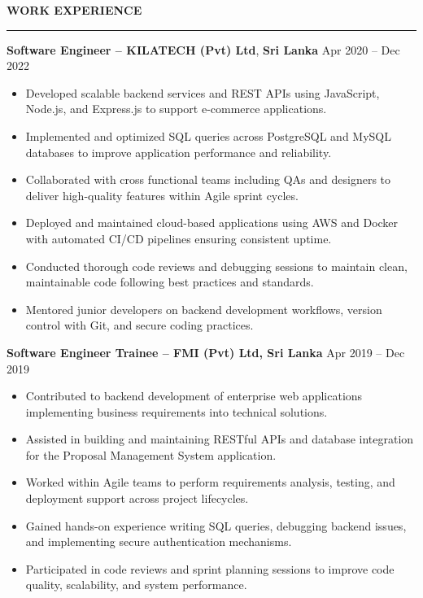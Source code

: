 \documentclass[10pt,letterpaper]{article}
\begin{document}
\textbf{WORK EXPERIENCE}\\[-8pt]
\noindent\rule{\textwidth}{1pt}

\vspace{-2pt}

\textbf{Software Engineer -- KILATECH (Pvt) Ltd}, \textbf{Sri Lanka} \hfill Apr 2020 -- Dec 2022

\vspace{-1pt}

\begin{itemize}
\item Developed scalable backend services and REST APIs using JavaScript, Node.js, and Express.js to support e-commerce applications.
\item Implemented and optimized SQL queries across PostgreSQL and MySQL databases to improve application performance and reliability.
\item Collaborated with cross functional teams including QAs and designers to deliver high-quality features within Agile sprint cycles.
\item Deployed and maintained cloud-based applications using AWS and Docker with automated CI/CD pipelines ensuring consistent uptime.
\item Conducted thorough code reviews and debugging sessions to maintain clean, maintainable code following best practices and standards.
\item Mentored junior developers on backend development workflows, version control with Git, and secure coding practices.
\end{itemize}

\textbf{Software Engineer Trainee -- FMI (Pvt) Ltd, Sri Lanka} \hfill Apr 2019 -- Dec 2019

\vspace{-1pt}

\begin{itemize}
\item Contributed to backend development of enterprise web applications implementing business requirements into technical solutions.
\item Assisted in building and maintaining RESTful APIs and database integration for the Proposal Management System application.
\item Worked within Agile teams to perform requirements analysis, testing, and deployment support across project lifecycles.
\item Gained hands-on experience writing SQL queries, debugging backend issues, and implementing secure authentication mechanisms.
\item Participated in code reviews and sprint planning sessions to improve code quality, scalability, and system performance.
\end{itemize}
\end{document}
